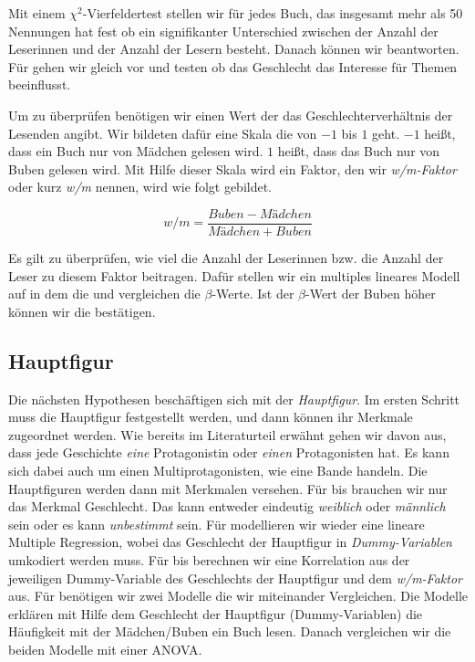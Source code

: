 Mit einem $\chi^2$-Vierfeldertest stellen wir für jedes Buch, das
insgesamt mehr als 50 Nennungen hat fest ob ein signifikanter
Unterschied zwischen der Anzahl der Leserinnen und der Anzahl der Lesern
besteht. Danach können wir  beantworten. Für
 gehen wir gleich vor und testen ob das Geschlecht das
Interesse für Themen beeinflusst.

Um  zu überprüfen benötigen wir einen Wert der das
Geschlechterverhältnis der Lesenden angibt. Wir bildeten dafür eine
Skala die von $-1$ bis $1$ geht. $-1$ heißt, dass ein Buch nur von
Mädchen gelesen wird. $1$ heißt, dass das Buch nur von Buben gelesen
wird. Mit Hilfe dieser Skala wird ein Faktor, den wir \emph{w/m-Faktor}
oder kurz \emph{w/m} nennen, wird wie folgt gebildet.

\begin{equation}
    w/m=\frac{Buben-Mädchen}{Mädchen+Buben}
\end{equation}

Es gilt zu überprüfen, wie viel die Anzahl der Leserinnen bzw. die
Anzahl der Leser zu diesem Faktor beitragen. Dafür stellen wir ein
multiples lineares Modell auf in dem die und vergleichen die
$\beta$-Werte. Ist der $\beta$-Wert der Buben höher können wir die
 bestätigen.

\subsection{Hauptfigur}

Die nächsten Hypothesen beschäftigen sich mit der \emph{Hauptfigur}. Im
ersten Schritt muss die Hauptfigur festgestellt werden, und dann können
ihr Merkmale zugeordnet werden. Wie bereits im Literaturteil erwähnt
gehen wir davon aus, dass jede Geschichte \emph{eine} Protagonistin oder
\emph{einen} Protagonisten hat. Es kann sich dabei auch um einen
Multiprotagonisten, wie \zB eine Bande handeln. Die Hauptfiguren werden
dann mit Merkmalen versehen. Für  bis  brauchen
wir nur das Merkmal Geschlecht. Das kann entweder eindeutig
\emph{weiblich} oder \emph{männlich} sein oder es kann \emph{unbestimmt}
sein. Für  modellieren wir wieder eine lineare Multiple
Regression, wobei das Geschlecht der Hauptfigur in
\emph{Dummy-Variablen} umkodiert werden muss. Für  bis
 berechnen wir eine Korrelation aus der jeweiligen
Dummy-Variable des Geschlechts der Hauptfigur und dem \emph{w/m-Faktor}
aus. Für  benötigen wir zwei Modelle die wir miteinander
Vergleichen. Die Modelle erklären mit Hilfe dem Geschlecht der
Hauptfigur (Dummy-Variablen) die Häufigkeit mit der Mädchen/Buben ein
Buch lesen. Danach vergleichen wir die beiden Modelle mit einer ANOVA.


